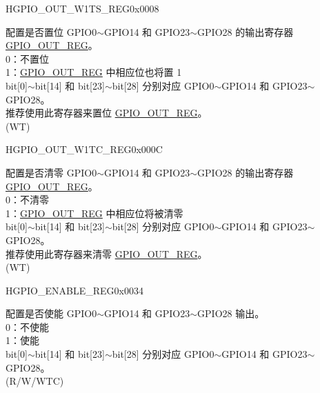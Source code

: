 \begin{register}{H}{GPIO\_OUT\_W1TS\_REG}{0x0008}\label{regdesc:GPIOOUTW1TSREG}
%
\regnewline%
\begin{regdesc}\begin{reglist}
\label{fielddesc:GPIOOUTW1TS}\item [GPIO\_OUT\_W1TS] 配置是否置位 GPIO0$\sim$GPIO14 和 GPIO23$\sim$GPIO28 的输出寄存器 \hyperref[regdesc:GPIOOUTREG]{GPIO\_OUT\_REG}。\\
0：不置位\\
1：\hyperref[regdesc:GPIOOUTREG]{GPIO\_OUT\_REG} 中相应位也将置 1\\
bit[0]$\sim$bit[14] 和 bit[23]$\sim$bit[28] 分别对应 GPIO0$\sim$GPIO14 和 GPIO23$\sim$GPIO28。\\
推荐使用此寄存器来置位 \hyperref[regdesc:GPIOOUTREG]{GPIO\_OUT\_REG}。 \\ (WT)
\end{reglist}\end{regdesc}
\end{register}


\begin{register}{H}{GPIO\_OUT\_W1TC\_REG}{0x000C}\label{regdesc:GPIOOUTW1TCREG}
%
\regnewline%
\begin{regdesc}\begin{reglist}
\label{fielddesc:GPIOOUTW1TC}\item [GPIO\_OUT\_W1TC] 配置是否清零 GPIO0$\sim$GPIO14 和 GPIO23$\sim$GPIO28 的输出寄存器 \hyperref[regdesc:GPIOOUTREG]{GPIO\_OUT\_REG}。\\ 
0：不清零\\
1：\hyperref[regdesc:GPIOOUTREG]{GPIO\_OUT\_REG} 中相应位将被清零\\
bit[0]$\sim$bit[14] 和 bit[23]$\sim$bit[28] 分别对应 GPIO0$\sim$GPIO14 和 GPIO23$\sim$GPIO28。\\
推荐使用此寄存器来清零 \hyperref[regdesc:GPIOOUTREG]{GPIO\_OUT\_REG}。 \\ (WT)
\end{reglist}\end{regdesc}
\end{register}


\begin{register}{H}{GPIO\_ENABLE\_REG}{0x0034}\label{regdesc:GPIOENABLEREG}
%
\regnewline%
\begin{regdesc}\begin{reglist}
\label{fielddesc:GPIOENABLEDATA}\item [GPIO\_ENABLE\_DATA] 配置是否使能 GPIO0$\sim$GPIO14 和 GPIO23$\sim$GPIO28 输出。\\
0：不使能\\
1：使能\\ 
bit[0]$\sim$bit[14] 和 bit[23]$\sim$bit[28] 分别对应 GPIO0$\sim$GPIO14 和 GPIO23$\sim$GPIO28。\\(R/W/WTC)
\end{reglist}\end{regdesc}
\end{register}


